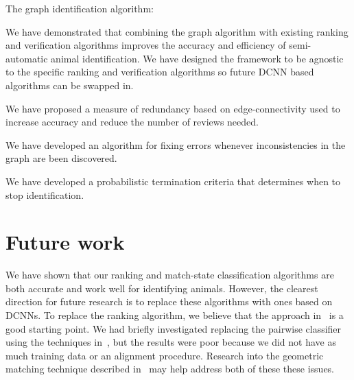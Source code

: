 \begin{enumln}
    \item {The graph identification algorithm}:
        \begin{enumln}

        \item 
            We have demonstrated that combining the graph algorithm with existing ranking and verification
              algorithms improves the accuracy and efficiency of semi-automatic animal identification.
            We have designed the framework to be agnostic to the specific ranking and verification algorithms so
              future DCNN based algorithms can be swapped in.

        \item We have proposed a measure of redundancy based on edge-connectivity used to increase accuracy and
          reduce the number of reviews needed.

        \item We have developed an algorithm for fixing errors whenever inconsistencies in the graph are been
          discovered.

        \item We have developed a probabilistic termination criteria that determines when to stop identification.
        \end{enumln}
    \end{enumln}

    \section{Future work}\label{sec:futurework}

    We have shown that our ranking and match-state classification algorithms are both accurate and work well for
      identifying animals.
    However, the clearest direction for future research is to replace these algorithms with ones based on DCNNs.
    To replace the ranking algorithm, we believe that the approach in~\cite{arandjelovic_netvlad_2016} is a good
      starting point.
    We had briefly investigated replacing the pairwise classifier using the techniques
      in~\cite{taigman_deepface_2014}, but the results were poor because we did not have as much training data or
      an alignment procedure.
    Research into the geometric matching technique described in~\cite{rocco_convolutional_2017} may help address
      both of these these issues.


